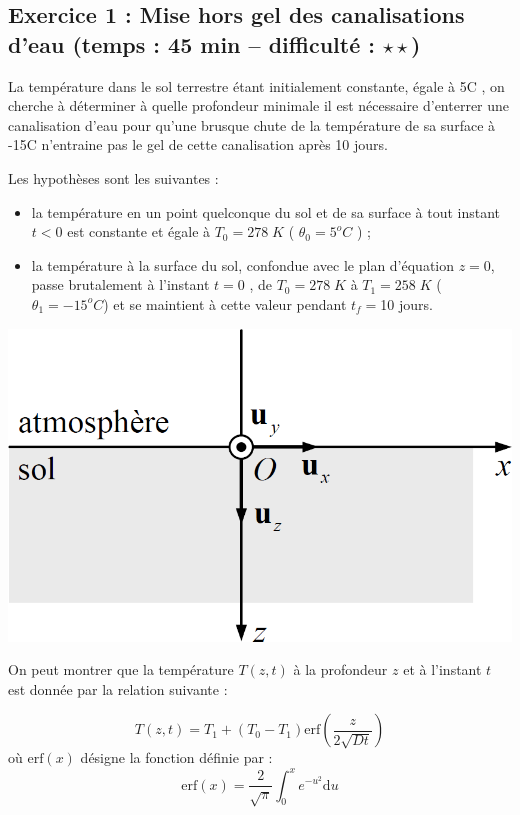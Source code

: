 


\subsection*{Exercice 1 : Mise hors gel des canalisations d'eau (temps : 45 min – difficulté : $\star\star $)}

La température dans le sol terrestre étant initialement constante, égale à 5\textdegree C , on cherche à déterminer
à quelle profondeur minimale il est nécessaire d’enterrer une canalisation d’eau pour qu’une brusque
chute de la température de sa surface à -15\textdegree C n’entraine pas le gel de cette canalisation après 10 jours.



Les hypothèses sont les suivantes :
\begin{itemize}
\item la température en un point quelconque du sol et de sa surface à tout instant $t < 0$ est constante et égale à $T_0=278\;K$ ( $\theta_0=5^oC$ ) ;
\item la température à la surface du sol, confondue avec le plan d’équation $z = 0$, passe brutalement à l’instant $t = 0$ , de $T_0 = 278\;K$ à $T_1 =  258\; K$ ($\theta_1 = -15^o C$) et se maintient à cette valeur pendant
$t_f= $10 jours.
\end{itemize}
\begin{center}
\includegraphics[width=.95\linewidth]{images/canalisation}
\end{center}
On peut montrer que la température $T(z, t)$ à la profondeur $z$ et à l’instant $t$ est donnée par la relation suivante :

$$
T(z,t)=T_1 + (T_0-T_1) \text{erf}\left( \dfrac{z}{2\sqrt{Dt}} \right)
$$
où $\text{erf}(x)$ désigne la fonction définie par :
$$
\text{erf}(x) = \dfrac{2}{\sqrt{\pi}}\int^x_0 e^{-u^2} \mathrm{d}u
$$

